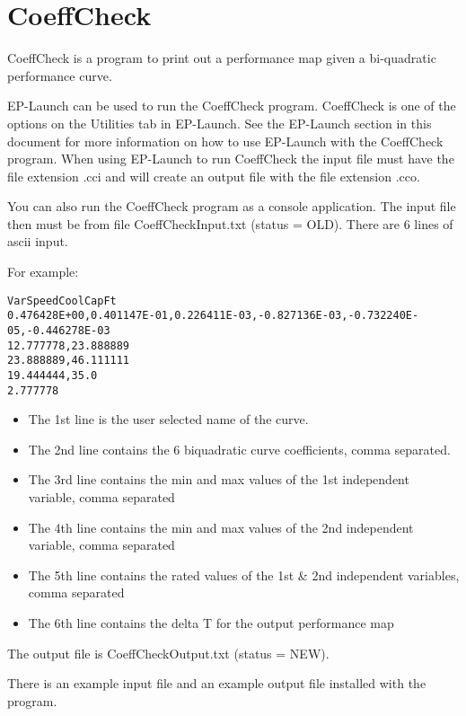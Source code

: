 \section{CoeffCheck}\label{coeffcheck}

CoeffCheck is a program to print out a performance map given a bi-quadratic performance curve.

EP-Launch can be used to run the CoeffCheck program. CoeffCheck is one of the options on the Utilities tab in EP-Launch. See the EP-Launch section in this document for more information on how to use EP-Launch with the CoeffCheck program. When using EP-Launch to run CoeffCheck the input file must have the file extension .cci and will create an output file with the file extension .cco.

You can also run the CoeffCheck program as a console application. The input file then must be from file CoeffCheckInput.txt (status = OLD). There are 6 lines of ascii input.

For example:

\begin{lstlisting}
VarSpeedCoolCapFt
0.476428E+00,0.401147E-01,0.226411E-03,-0.827136E-03,-0.732240E-05,-0.446278E-03
12.777778,23.888889
23.888889,46.111111
19.444444,35.0
2.777778
\end{lstlisting}

\begin{itemize}
\tightlist
\item
  The 1st line is the user selected name of the curve.
\item
  The 2nd line contains the 6 biquadratic curve coefficients, comma separated.
\item
  The 3rd line contains the min and max values of the 1st independent variable, comma separated
\item
  The 4th line contains the min and max values of the 2nd independent variable, comma separated
\item
  The 5th line contains the rated values of the 1st \& 2nd independent variables, comma separated
\item
  The 6th line contains the delta T for the output performance map
\end{itemize}

The output file is CoeffCheckOutput.txt (status = NEW).

There is an example input file and an example output file installed with the program.
